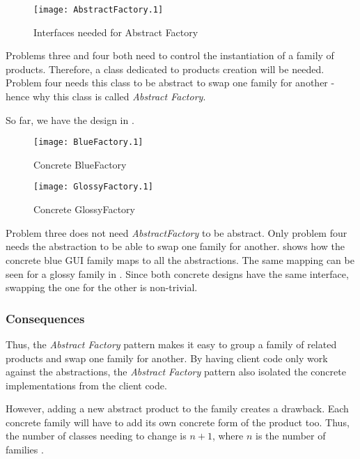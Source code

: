 \begin{figure}[h]
	\centering
	\texttt{[image: AbstractFactory.1]}
	\caption{Interfaces needed for Abstract Factory}
	\label{fig:AbstractFactoryInterface}
\end{figure}

Problems three and four both need to control the instantiation of a family of products.
Therefore, a class dedicated to products creation will be needed.
Problem four needs this class to be abstract to swap one family for another - hence why this class is called \textit{Abstract Factory}.

So far, we have the design in .

\begin{figure}[h]
	\centering
	\texttt{[image: BlueFactory.1]}
	\caption{Concrete BlueFactory}
	\label{fig:BlueFactory}
\end{figure}

\begin{figure}[h]
	\centering
	\texttt{[image: GlossyFactory.1]}
	\caption{Concrete GlossyFactory}
	\label{fig:GlossyFactory}
\end{figure}

Problem three does not need \textit{AbstractFactory} to be abstract.
Only problem four needs the abstraction to be able to swap one family for another.
 shows how the concrete blue GUI family maps to all the abstractions.
The same mapping can be seen for a glossy family in .
Since both concrete designs have the same interface, swapping the one for the other is non-trivial.

\subsubsection{Consequences}
Thus, the \textit{Abstract Factory} pattern makes it easy to group a family of related products and swap one family for another.
By having client code only work against the abstractions, the \textit{Abstract Factory} pattern also isolated the concrete implementations from the client code.

However, adding a new abstract product to the family creates a drawback.
Each concrete family will have to add its own concrete form of the product too.
Thus, the number of classes needing to change is \(n + 1\), where \(n\) is the number of families \cite{bulajic_12_01}.


